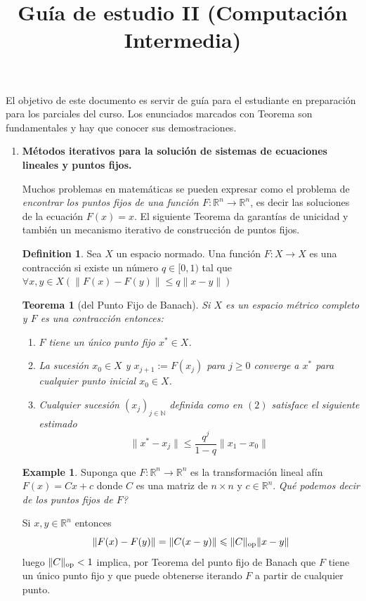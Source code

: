 \documentclass[12pt]{amsart}
\title{Guía de estudio II (Computación Intermedia)}
\newtheorem{theorem}[lemma]{Teorema}
\theoremstyle{definition}
\newtheorem{definition}[lemma]{Definition}
\newtheorem{examplex}[lemma]{Example}
\renewcommand{\geq}{\geqslant}
\renewcommand{\leq}{\leqslant}
\newcommand{\RR}{\ensuremath{\mathbb{R}}}
\begin{document}
\maketitle
El objetivo de este documento es servir de guía para el estudiante en preparación para los parciales del curso.
Los enunciados marcados con Teorema son fundamentales y hay que conocer sus demostraciones.

\begin{enumerate}

\item {\bf Métodos iterativos para la solución de sistemas de ecuaciones lineales y puntos fijos.}

Muchos problemas en matemáticas se pueden expresar como el problema de \emph{encontrar los puntos fijos de una función $F:\RR^n\rightarrow \RR^n$}, es decir las soluciones de la ecuación $F(x)=x$. El siguiente Teorema da garantías de unicidad y también un mecanismo iterativo de construcción de puntos fijos.

\begin{definition} Sea $X$ un espacio normado. Una función $F:X\rightarrow X$ es una contracci\'on si existe un número $q\in [0, 1)$ tal que $\forall x,y\in X\left(\|F(x)-F(y)\|\leq q \|x-y\|\right)$
\end{definition}

\begin{theorem}[del Punto Fijo de Banach] Si $X$ es un espacio métrico completo y $F$ es una contracción entonces:

\begin{enumerate}
\item $F$ tiene un único punto fijo $x^*\in X$.
\item La sucesión $x_0\in X$ y $x_{j+1}:=F(x_j)$ para $j\geq 0$ converge a $x^*$ para cualquier punto inicial $x_0\in X$. 
\item Cualquier sucesión  $(x_j)_{j\in \mathbb{N}}$ definida como en $(2)$ satisface el siguiente estimado
\[\|x^*-x_j\|\leq \frac{q^j}{1-q}\|x_1-x_0\|\]
\end{enumerate}
\end{theorem}

\begin{examplex}\label{Ex: linear} Suponga que $F:\RR^n\rightarrow \RR^n$ es la transformación lineal afín $F(x)=Cx+c$ donde $C$ es una matriz de $n\times n$ y $c\in \RR^n$. \emph{Qué podemos decir de los puntos fijos de $F$?}

Si $x,y\in \RR^n$ entonces
\[\|F(x)-F(y)\| = \|C(x-y)\|\leq \|C\|_{\rm op} \|x-y\|\]
luego $\|C\|_{\rm op}<1$ implica, por Teorema del punto fijo de Banach que $F$ tiene un único punto fijo y que puede obtenerse iterando $F$ a partir de cualquier punto.


\end{examplex}
\end{enumerate}
\end{document}
